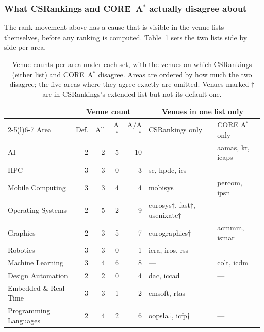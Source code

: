 \documentclass[11pt]{article}
\newcommand{\csr}{CSRankings}
\begin{document}
\subsubsection{What \csr{} and CORE~A$^*$ actually disagree about}
\label{sec:venuecomposition}

The rank movement above has a cause that is visible in the venue lists
themselves, before any ranking is computed. Table~\ref{tab:venuecomp} sets the
two lists side by side per area.

\begin{table}[t]
\centering
\small
\setlength{\tabcolsep}{4pt}
\caption{Venue counts per area under each set, with the venues on which \csr{}
(either list) and CORE~A$^*$ disagree. Areas are ordered by how much the two
disagree; the five areas where they agree exactly are omitted. Venues marked
$\dagger$ are in \csr{}'s extended list but not its default one.}
\label{tab:venuecomp}
\begin{tabular}{lrrrr ll}
\toprule
& \multicolumn{4}{c}{Venue count} & \multicolumn{2}{c}{Venues in one list only} \\
\cmidrule(r){2-5}\cmidrule(l){6-7}
Area & Def. & All & A$^*$ & A/A$^*$ & \csr{} only & CORE A$^*$ only \\
\midrule
AI                    & 2 & 2 & 5 & 10 & ---                                          & aamas, kr, icaps \\
HPC                   & 3 & 3 & 0 & 3  & sc, hpdc, ics                                & --- \\
Mobile Computing      & 3 & 3 & 4 & 4  & mobisys                                      & percom, ipsn \\
Operating Systems     & 2 & 5 & 2 & 9  & eurosys$\dagger$, fast$\dagger$, usenixatc$\dagger$ & --- \\
Graphics              & 2 & 3 & 5 & 7  & eurographics$\dagger$                        & acmmm, ismar \\
Robotics              & 3 & 3 & 0 & 1  & icra, iros, rss                              & --- \\
Machine Learning      & 3 & 4 & 6 & 8  & ---                                          & colt, icdm \\
Design Automation     & 2 & 2 & 0 & 4  & dac, iccad                                   & --- \\
Embedded \& Real-Time & 3 & 3 & 1 & 2  & emsoft, rtas                                 & --- \\
Programming Languages & 2 & 4 & 2 & 6  & oopsla$\dagger$, icfp$\dagger$               & --- \\

\end{tabular}
\end{table}
\end{document}
